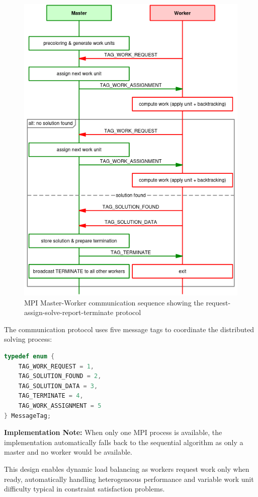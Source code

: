 \begin{enumerate}
\begin{figure}[htbp]
\centering
\includegraphics[width=0.9\linewidth]{imgs/mpi_msc.png}
\caption{MPI Master-Worker communication sequence showing the request-assign-solve-report-terminate protocol}
\label{fig:mpi_sequence}
\end{figure}

The communication protocol uses five message tags to coordinate the distributed solving process:

\begin{lstlisting}[language=C, caption=MPI communication protocol, label={listing:mpi_tags}]
typedef enum {
    TAG_WORK_REQUEST = 1,
    TAG_SOLUTION_FOUND = 2,
    TAG_SOLUTION_DATA = 3,
    TAG_TERMINATE = 4,
    TAG_WORK_ASSIGNMENT = 5
} MessageTag;
\end{lstlisting}

\textbf{Implementation Note:} When only one MPI process is available, the implementation automatically falls back to the sequential algorithm as only a master and no worker would be available.

This design enables dynamic load balancing as workers request work only when ready, automatically handling heterogeneous performance and variable work unit difficulty typical in constraint satisfaction problems.



\end{enumerate}
